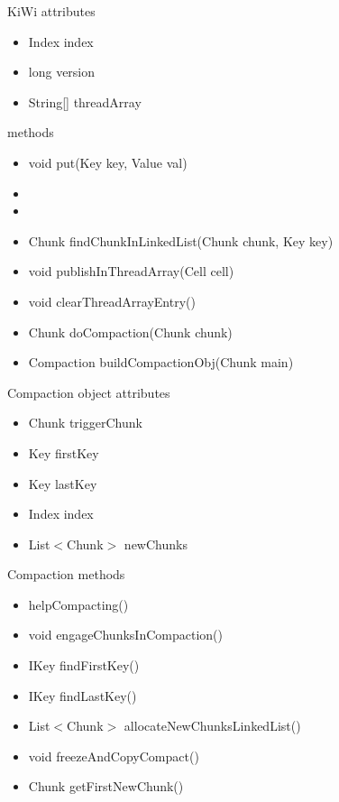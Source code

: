 \renewcommand{\ttdefault}{pcr}
\algrenewcommand{}
\algrenewcommand{}
\algrenewcommand{}
\algrenewcommand{}
\algrenewcommand{}
\algrenewcommand\textproc{\textit}
\newcommand{\codesize}{\footnotesize}



KiWi attributes
\begin{itemize} 
\item Index index
\item long version
\item String[] threadArray
\end{itemize}
methods
\begin{itemize} 
\item void put(Key key, Value val)
\item
\item
\item Chunk findChunkInLinkedList(Chunk chunk, Key key)
\item void publishInThreadArray(Cell cell)
\item void clearThreadArrayEntry()
\item Chunk doCompaction(Chunk chunk)
\item Compaction buildCompactionObj(Chunk main)
\end{itemize} 

Compaction object attributes
\begin{itemize} 
\item Chunk triggerChunk
\item Key firstKey
\item Key lastKey
\item Index index
\item List$<$Chunk$>$ newChunks
\end{itemize}
Compaction methods
\begin{itemize} 
\item helpCompacting()
\item void engageChunksInCompaction()
\item IKey findFirstKey()
\item IKey findLastKey()
\item List$<$Chunk$>$ allocateNewChunksLinkedList()
\item void freezeAndCopyCompact()
\item Chunk getFirstNewChunk()
\end{itemize}

